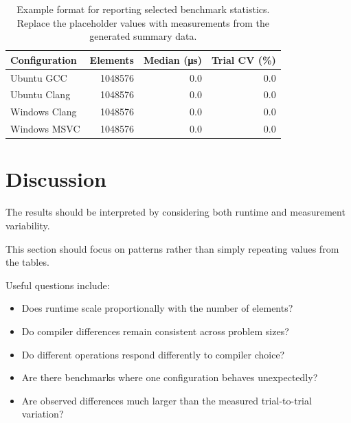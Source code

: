 \documentclass[11pt]{article}
\begin{document}
\begin{table}[H]
    \centering

    \begin{tabular}{lrrr}
        \toprule
        \textbf{Configuration} &
        \textbf{Elements} &
        \textbf{Median (\si{\micro\second})} &
        \textbf{Trial CV (\%)} \\
        \midrule

        Ubuntu GCC &
        \num{1048576} &
        0.0 &
        0.0 \\

        Ubuntu Clang &
        \num{1048576} &
        0.0 &
        0.0 \\

        Windows Clang &
        \num{1048576} &
        0.0 &
        0.0 \\

        Windows MSVC &
        \num{1048576} &
        0.0 &
        0.0 \\

        \bottomrule
    \end{tabular}

    \caption{
        Example format for reporting selected benchmark statistics.
        Replace the placeholder values with measurements from the
        generated summary data.
    }

    \label{tab:example-results}
\end{table}


\section{Discussion}

The results should be interpreted by considering both runtime
and measurement variability.

This section should focus on patterns rather than simply
repeating values from the tables.

Useful questions include:

\begin{itemize}

    \item Does runtime scale proportionally with the number of elements?

    \item Do compiler differences remain consistent across problem sizes?

    \item Do different operations respond differently to compiler choice?

    \item Are there benchmarks where one configuration behaves
          unexpectedly?

    \item Are observed differences much larger than the measured
          trial-to-trial variation?

\end{itemize}
\end{document}
